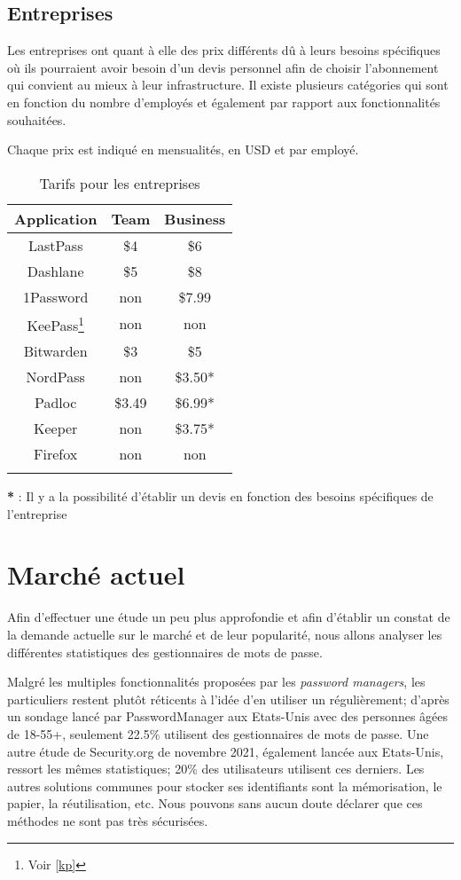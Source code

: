\subsection{Entreprises}
Les entreprises ont quant à elle des prix différents dû à leurs besoins spécifiques où ils pourraient avoir besoin d'un devis personnel afin de choisir l'abonnement qui convient au mieux à leur infrastructure. Il existe plusieurs catégories qui sont en fonction du nombre d'employés et également par rapport aux fonctionnalités souhaitées. 

Chaque prix est indiqué en mensualités, en USD et par employé.
\begin{longtable}[h]{|c|c|c|}
	\hline
	Application & Team & Business \\
	\hline
	LastPass & \$4 & \$6  \\
	\hline
	Dashlane & \$5 & \$8 \\
	\hline
	1Password & non  & \$7.99  \\
	\hline
	KeePass\footnote{Voir \ref{kp}} & non & non \\
	\hline
	Bitwarden & \$3 & \$5  \\
	\hline
	NordPass & non & \$3.50* \\
	\hline
	Padloc & \$3.49 & \$6.99* \\
	\hline
	Keeper & non & \$3.75* \\
	\hline
	Firefox & non & non \\
    \hline
	\caption{Tarifs pour les entreprises}
\end{longtable}
\textbf{*}\hspace{0.1cm} :  Il y a la possibilité d'établir un devis en fonction des besoins spécifiques de l'entreprise \\

\section{Marché actuel}
Afin d'effectuer une étude un peu plus approfondie et afin d'établir un constat de la demande actuelle sur le marché et de leur popularité, nous allons analyser les différentes statistiques des gestionnaires de mots de passe. 

Malgré les multiples fonctionnalités proposées par les \textit{password managers}, les particuliers restent plutôt réticents à l'idée d'en utiliser un régulièrement; d'après un sondage lancé par PasswordManager\cite{PMC} aux Etats-Unis avec des personnes âgées de 18-55+, seulement 22.5\% utilisent des gestionnaires de mots de passe. Une autre étude de Security.org\cite{PM21} de novembre 2021, également lancée aux Etats-Unis, ressort les mêmes statistiques; 20\% des utilisateurs utilisent ces derniers. Les autres solutions communes pour stocker ses identifiants sont la mémorisation, le papier, la réutilisation, etc. Nous pouvons sans aucun doute déclarer que ces méthodes ne sont pas très sécurisées. 

